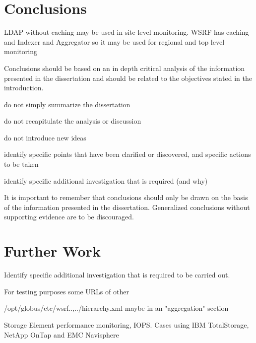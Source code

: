 \section{Conclusions}

LDAP without caching may be used in site level monitoring.
WSRF has caching and Indexer and Aggregator so it may be used for regional and top level monitoring


Conclusions should be based on an in depth critical analysis of the information presented in the dissertation and should be related to the objectives stated in the introduction.

do not simply summarize the dissertation

do not recapitulate the analysis or discussion

do not introduce new ideas

identify specific points that have been clarified or discovered, and specific actions to be taken

identify specific additional investigation that is required (and why)

It is important to remember that conclusions should only be drawn on the basis of the information presented in the dissertation. Generalized conclusions without supporting evidence are to be
discouraged.

\section{Further Work}
Identify specific additional investigation that is required to be carried out.

For testing purposes some URLs of other 

/opt/globus/etc/wsrf..,../hierarchy.xml maybe in an "aggregation" section

Storage Element performance monitoring, IOPS. Cases using IBM TotalStorage, NetApp OnTap and EMC Navisphere
